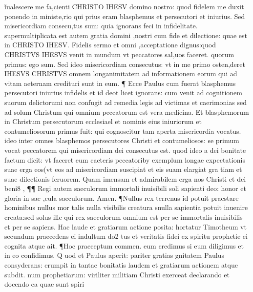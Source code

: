 \documentclass{article}
\begin{document}
\begin{pages}
ĩualescere me fa,cienti CHRISTO IHESV domino nostro: quod fidelem me duxit ponendo in ministe,rio qui prius eram blasphemus et persecutori et iniurius. Sed misericordiam consecu,tus sum: quia ignorans feci in infidelitate. supermultiplicata est autem gratia domini ,nostri cum fide et dilectione: quae est in CHRISTO IHESV. Fidelis sermo et omni ,acceptatione dignus:quod CHRISTVS IHESVS venit in mundum vt peccatores sal,uos faceret. quorum primus: ego sum. Sed ideo misericordiam consecutus: vt in me primo osten,deret IHESVS CHRISTVS omnem longanimitatem ad informationem eorum qui ad vitam aeternam credituri sunt in eum. ¶ Ecce Paulus cum fuerat blasphemus persecutori iniurius infidelis et id deot licet ignorans: cum venit ad cognitionem suorum delictorumi non confugit ad remedia legis ad victimas et caerimonias sed ad solum Christum qui omnium peccatorum est vera medicina. Et blasphemorum in Christum persecutorum ecclesiael et nominis eius iniuriorum et contumeliosorum primus fuit: qui cognoscitur tam aperta misericordia vocatus. ideo inter omnes blasphemos persecutores Christi et contumeliosos: se primum vocat peccatorem qui misericordiam dei consecutus est. quod ideo a dei bonitate factum dicit: vt faceret eum caeteris peccatoriby exemplum longae expectationis suae erga eos(vt eos ad misericordiam suscipiat et eis suam elargiat gra tiam et suae dilectionis feruorem. Quam imensam et admirabilem erga nos Christi et dei beni8 , ¶¶ Regi autem saeculorum immortali inuisibili soli sapienti deo: honor et gloria in sae ,cula saeculorum. Amen. ¶Nullus rex terrenus id potuit praestare hominibus nullus mor talis nulla visibilis creatura snulla sapientia potuit inuenire creata:sed solus ille qui rex saeculorum omnium est per se immortalis inuisibilis et per se sapiens. Hac laude et gratiarum actione posita: hortatur Timotheum vt secundum praecedens ei indultum do2  tus et veritatis fidei ex spiritu prophetie ei cognita atque ait. ¶Hoc praeceptum commen. eum credimus si eum diligimus et in eo confidimus. Q uod et Paulus aperit: pariter gratias gnitatem Paulus consyderans: erumpit in tantae bonitatis laudem et gratiarum actionem atque subdit. num prophetiarum: viriliter militiam Christi exerceat declarando et docendo ea quae sunt spiri\pend

\end{pages}
\end{document}
